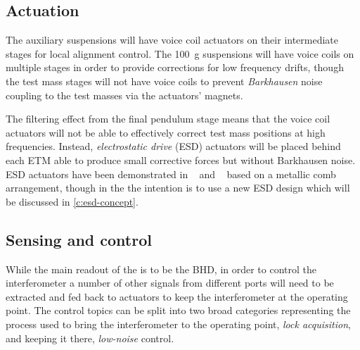 \subsection{\label{sec:ssm-actuation}Actuation}
The auxiliary suspensions will have voice coil actuators on their intermediate stages for local alignment control. The \SI{100}{\gram} suspensions will have voice coils on multiple stages in order to provide corrections for low frequency drifts, though the test mass stages will not have voice coils to prevent \emph{Barkhausen} noise~\cite{Weiss2008} coupling to the test masses via the actuators' magnets.

The filtering effect from the final pendulum stage means that the voice coil actuators will not be able to effectively correct test mass positions at high frequencies. Instead, \emph{electrostatic drive} (\gls{ESD}) actuators will be placed behind each \gls{ETM} able to produce small corrective forces but without Barkhausen noise. \gls{ESD} actuators have been demonstrated in \GEO{}~\cite{Hewitson2007} and \ALIGO{}~\cite{Aston2012} based on a metallic comb arrangement, though in the \SSMEXPT{} the intention is to use a new \gls{ESD} design which will be discussed in \cref{c:esd-concept}.

\subsection{\label{sec:ssm-sensing-and-control}Sensing and control}
While the main readout of the \SSMEXPT{} is to be the \gls{BHD}, in order to control the interferometer a number of other signals from different ports will need to be extracted and fed back to actuators to keep the interferometer at the operating point. The control topics can be split into two broad categories representing the process used to bring the interferometer to the operating point, \emph{lock acquisition}, and keeping it there, \emph{low-noise} control.

